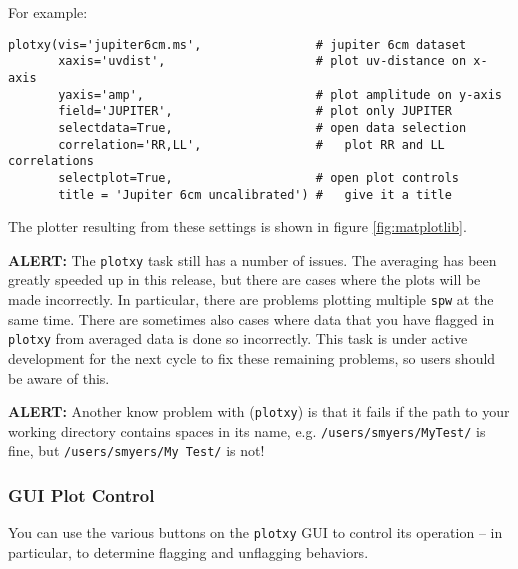 For example:
\small
\begin{verbatim}
plotxy(vis='jupiter6cm.ms',                # jupiter 6cm dataset
       xaxis='uvdist',                     # plot uv-distance on x-axis
       yaxis='amp',                        # plot amplitude on y-axis
       field='JUPITER',                    # plot only JUPITER
       selectdata=True,                    # open data selection
       correlation='RR,LL',                #   plot RR and LL correlations
       selectplot=True,                    # open plot controls
       title = 'Jupiter 6cm uncalibrated') #   give it a title 
\end{verbatim}
\normalsize
The plotter resulting from these settings is shown in figure \ref{fig:matplotlib}.  

{\bf ALERT:} The {\tt plotxy} task still has a number of issues.
The averaging has been greatly speeded up in this release, but there
are cases where the plots will be made incorrectly.  In particular,
there are problems plotting multiple {\tt spw} at the same time.
There are sometimes also cases where data that you have flagged in 
{\tt plotxy} from averaged data is done so incorrectly.  This task is
under active development for the next cycle to fix these remaining 
problems, so users should be aware of this.

{\bf ALERT:} Another know problem with ({\tt plotxy}) is that it
fails if the path to your working directory contains spaces in
its name, e.g. {\tt /users/smyers/MyTest/} is fine, but 
{\tt /users/smyers/My\ Test/} is not!



\subsubsection{GUI Plot Control}
\label{section:edit.plot.plotxy.control}

You can use the various buttons on the {\tt plotxy} GUI to control
its operation -- in particular, to determine flagging and unflagging
behaviors.

